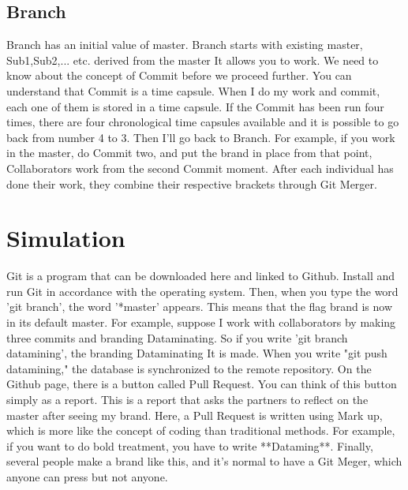 \documentclass{article}
\begin{document}
	\subsection{Branch}
	Branch has an initial value of master. Branch starts with existing master, Sub1,Sub2,... etc. derived from the master
	It allows you to work. We need to know about the concept of Commit before we proceed further. You can understand that Commit is a time capsule.
	When I do my work and commit, each one of them is stored in a time capsule.
	If the Commit has been run four times, there are four chronological time capsules available and it is possible to go back from number 4 to 3.
	Then I'll go back to Branch. For example, if you work in the master, do Commit two, and put the brand in place from that point,
	Collaborators work from the second Commit moment. After each individual has done their work, they combine their respective brackets through Git Merger.
	
	\section{Simulation}
	Git is a program that can be downloaded here and linked to Github.
	Install and run Git in accordance with the operating system. Then, when you type the word 'git branch', the word '*master' appears. This means that the flag brand is now in its default master.
	For example, suppose I work with collaborators by making three commits and branding Dataminating. So if you write 'git branch datamining', the branding Dataminating
	It is made. 
	When you write "git push datamining," the database is synchronized to the remote repository.
	On the Github page, there is a button called Pull Request. You can think of this button simply as a report. This is a report that asks the partners to reflect on the master after seeing my brand.
	Here, a Pull Request is written using Mark up, which is more like the concept of coding than traditional methods. For example, if you want to do bold treatment, you have to write **Dataming**.
	Finally, several people make a brand like this, and it's normal to have a Git Meger, which anyone can press but not anyone.
\end{document}
